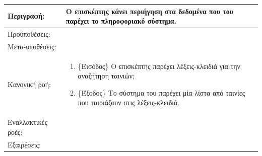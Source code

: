 \documentclass{assignment}
\begin{document}
\begin{longtable}{| p{3.5cm} | p{9cm} |}
\hline
Περιγραφή: &
Ο επισκέπτης κάνει περιήγηση στα δεδομένα που του παρέχει το πληροφοριακό σύστημα.\\
\hline
Προϋποθέσεις: &\mbox{}\par\vspace{-\baselineskip}
\\
\hline
Μετα-υποθέσεις: & \\
\hline
Κανονική ροή: &\mbox{}\par\vspace{-\baselineskip}
\begin{enumerate}
\item \{Εισόδος\} Ο επισκέπτης παρέχει λέξεις-κλειδιά για την αναζήτηση ταινιών;
\item \{Έξοδος\} Το σύστημα του παρέχει μία λίστα από ταινίες που ταιριάζουν στις λέξεις-κλειδιά.
\end{enumerate}\\
\hline
Εναλλακτικές ροές: &\mbox{}\par\vspace{-\baselineskip} 
\\
\hline
Εξαιρέσεις: &\mbox{}\par\vspace{-\baselineskip} 


\end{longtable}
\end{document}
